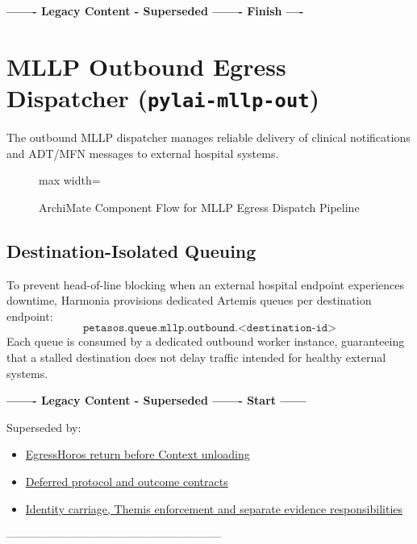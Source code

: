 \par\noindent\textbf{------- Legacy Content - Superseded ------- Finish ----}

\section{MLLP Outbound Egress Dispatcher (\texttt{pylai-mllp-out})}

The outbound MLLP dispatcher manages reliable delivery of clinical notifications and ADT/MFN messages to external hospital systems.

\begin{figure}[htbp]
    \centering
    \begin{adjustbox}{max width=\textwidth}
        
    \end{adjustbox}
    \caption{ArchiMate Component Flow for MLLP Egress Dispatch Pipeline}
    \label{fig:pylai_mllp_egress_process}
\end{figure}

\subsection{Destination-Isolated Queuing}
To prevent head-of-line blocking when an external hospital endpoint experiences downtime, Harmonia provisions dedicated Artemis queues per destination endpoint:
\begin{equation*}
\texttt{petasos.queue.mllp.outbound.<destination-id>}
\end{equation*}
Each queue is consumed by a dedicated outbound worker instance, guaranteeing that a stalled destination does not delay traffic intended for healthy external systems.

\par\noindent\textbf{------- Legacy Content - Superseded ------- Start ------}
\par\noindent Superseded by:
\begin{itemize}
  \item \href{../../markdown/05-information-systems-architecture/pylai-external-interoperability.md\#praxis-egress-horos}{EgressHoros return before Context unloading}
  \item \href{../../markdown/05-information-systems-architecture/gaps.md\#pylai-contracts}{Deferred protocol and outcome contracts}
  \item \href{../../markdown/05-information-systems-architecture/pylai-external-interoperability.md\#pylai-governance}{Identity carriage, Themis enforcement and separate evidence responsibilities}
\end{itemize}
\noindent ---------------------------------------------------------

